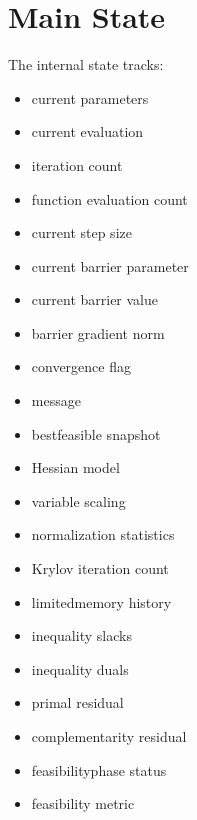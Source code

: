 \documentclass[letterpaper,10pt,english]{sphinxmanual}
\begin{document}
\section{Main State}
\label{\detokenize{optima_internal_protocol:main-state}}
\sphinxAtStartPar
The internal state tracks:
\begin{itemize}
\item {} 
\sphinxAtStartPar
current parameters

\item {} 
\sphinxAtStartPar
current evaluation

\item {} 
\sphinxAtStartPar
iteration count

\item {} 
\sphinxAtStartPar
function evaluation count

\item {} 
\sphinxAtStartPar
current step size

\item {} 
\sphinxAtStartPar
current barrier parameter

\item {} 
\sphinxAtStartPar
current barrier value

\item {} 
\sphinxAtStartPar
barrier gradient norm

\item {} 
\sphinxAtStartPar
convergence flag

\item {} 
\sphinxAtStartPar
message

\item {} 
\sphinxAtStartPar
best\sphinxhyphen{}feasible snapshot

\item {} 
\sphinxAtStartPar
Hessian model

\item {} 
\sphinxAtStartPar
variable scaling

\item {} 
\sphinxAtStartPar
normalization statistics

\item {} 
\sphinxAtStartPar
Krylov iteration count

\item {} 
\sphinxAtStartPar
limited\sphinxhyphen{}memory history

\item {} 
\sphinxAtStartPar
inequality slacks

\item {} 
\sphinxAtStartPar
inequality duals

\item {} 
\sphinxAtStartPar
primal residual

\item {} 
\sphinxAtStartPar
complementarity residual

\item {} 
\sphinxAtStartPar
feasibility\sphinxhyphen{}phase status

\item {} 
\sphinxAtStartPar
feasibility metric

\end{itemize}
\end{document}
